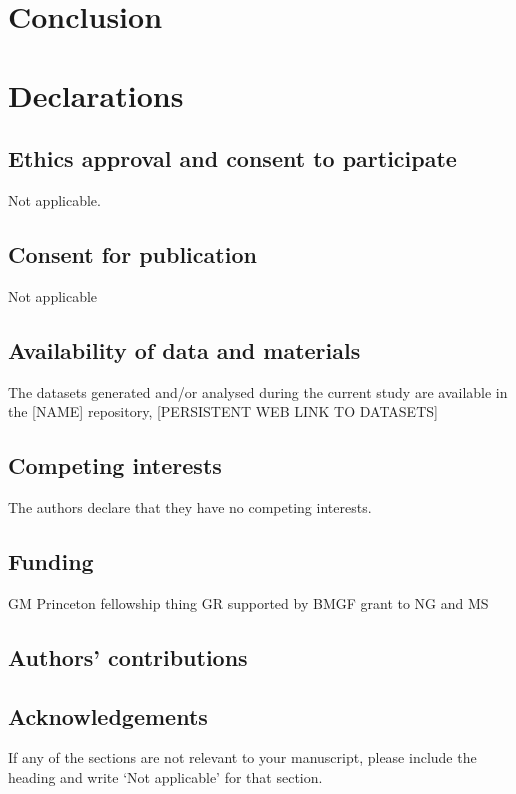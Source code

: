 \documentclass[sn-nature]{sn-jnl}%
\begin{document}
\section*{Conclusion}\label{conclusion}


\section*{Declarations}

\subsection*{Ethics approval and consent to participate}
Not applicable.

\subsection*{Consent for publication}
Not applicable

\subsection*{Availability of data and materials}
The datasets generated and/or analysed during the current study are available in the [NAME] repository, [PERSISTENT WEB LINK TO DATASETS]

\subsection*{Competing interests}
The authors declare that they have no competing interests.

\subsection*{Funding}
GM Princeton fellowship thing
GR supported by BMGF grant to NG and MS

\subsection*{Authors' contributions}

\subsection*{Acknowledgements}


\noindent
If any of the sections are not relevant to your manuscript, please include the heading and write `Not applicable' for that section. 
\end{document}
